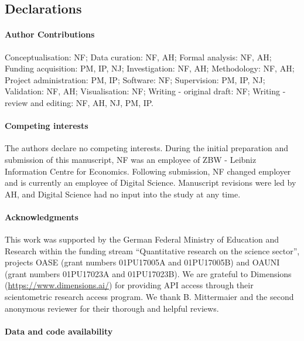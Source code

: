 \documentclass[
]{article}
\begin{document}
\hypertarget{declarations}{%
\subsection{Declarations}\label{declarations}}

\hypertarget{author-contributions}{%
\paragraph{Author Contributions}\label{author-contributions}}

Conceptualisation: NF; Data curation: NF, AH; Formal analysis: NF, AH; Funding acquisition: PM, IP, NJ; Investigation: NF, AH; Methodology: NF, AH; Project administration: PM, IP; Software: NF; Supervision: PM, IP, NJ; Validation: NF, AH; Visualisation: NF; Writing - original draft: NF; Writing - review and editing: NF, AH, NJ, PM, IP.

\hypertarget{competing-interests}{%
\paragraph{Competing interests}\label{competing-interests}}

The authors declare no competing interests. During the initial preparation and submission of this manuscript, NF was an employee of ZBW - Leibniz Information Centre for Economics. Following submission, NF changed employer and is currently an employee of Digital Science. Manuscript revisions were led by AH, and Digital Science had no input into the study at any time.

\hypertarget{acknowledgments}{%
\paragraph{Acknowledgments}\label{acknowledgments}}

This work was supported by the German Federal Ministry of Education and Research within the
funding stream ``Quantitative research on the science sector'', projects OASE (grant numbers 01PU17005A and 01PU17005B) and OAUNI (grant numbers 01PU17023A and 01PU17023B). We are grateful to Dimensions (\url{https://www.dimensions.ai/}) for providing API access through their scientometric research access program. We thank B. Mittermaier and the second anonymous reviewer for their thorough and helpful reviews.

\hypertarget{data-and-code-availability}{%
\paragraph{Data and code availability}\label{data-and-code-availability}}
\end{document}
